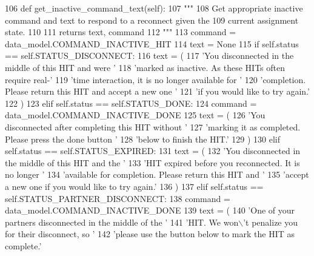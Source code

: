 \begin{DoxyCode}
106     \textcolor{keyword}{def }get\_inactive\_command\_text(self):
107         \textcolor{stringliteral}{"""}
108 \textcolor{stringliteral}{        Get appropriate inactive command and text to respond to a reconnect given the}
109 \textcolor{stringliteral}{        current assignment state.}
110 \textcolor{stringliteral}{}
111 \textcolor{stringliteral}{        returns text, command}
112 \textcolor{stringliteral}{        """}
113         command = data\_model.COMMAND\_INACTIVE\_HIT
114         text = \textcolor{keywordtype}{None}
115         \textcolor{keywordflow}{if} self.status == self.STATUS\_DISCONNECT:
116             text = (
117                 \textcolor{stringliteral}{'You disconnected in the middle of this HIT and were '}
118                 \textcolor{stringliteral}{'marked as inactive. As these HITs often require real-'}
119                 \textcolor{stringliteral}{'time interaction, it is no longer available for '}
120                 \textcolor{stringliteral}{'completion. Please return this HIT and accept a new one '}
121                 \textcolor{stringliteral}{'if you would like to try again.'}
122             )
123         \textcolor{keywordflow}{elif} self.status == self.STATUS\_DONE:
124             command = data\_model.COMMAND\_INACTIVE\_DONE
125             text = (
126                 \textcolor{stringliteral}{'You disconnected after completing this HIT without '}
127                 \textcolor{stringliteral}{'marking it as completed. Please press the done button '}
128                 \textcolor{stringliteral}{'below to finish the HIT.'}
129             )
130         \textcolor{keywordflow}{elif} self.status == self.STATUS\_EXPIRED:
131             text = (
132                 \textcolor{stringliteral}{'You disconnected in the middle of this HIT and the '}
133                 \textcolor{stringliteral}{'HIT expired before you reconnected. It is no longer '}
134                 \textcolor{stringliteral}{'available for completion. Please return this HIT and '}
135                 \textcolor{stringliteral}{'accept a new one if you would like to try again.'}
136             )
137         \textcolor{keywordflow}{elif} self.status == self.STATUS\_PARTNER\_DISCONNECT:
138             command = data\_model.COMMAND\_INACTIVE\_DONE
139             text = (
140                 \textcolor{stringliteral}{'One of your partners disconnected in the middle of the '}
141                 \textcolor{stringliteral}{'HIT. We won\(\backslash\)'t penalize you for their disconnect, so '}
142                 \textcolor{stringliteral}{'please use the button below to mark the HIT as complete.'}

\end{DoxyCode}
